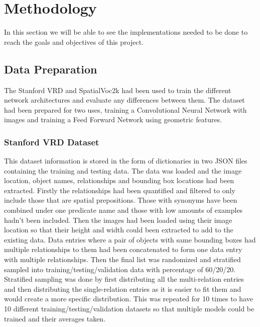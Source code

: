 \documentclass{csfyp}
\begin{document}
\section{Methodology}
In this section we will be able to see the implementations needed to be done to reach the goals and objectives of this project.

\subsection{Data Preparation}
The Stanford VRD and SpatialVoc2k had been used to train the different network architectures and evaluate any differences between them. The dataset had been prepared for two uses, training a Convolutional Neural Network with images and training a Feed Forward Network using geometric features. 

\subsubsection{Stanford VRD Dataset}
This dataset information is stored in the form of dictionaries in two JSON files containing the training and testing data. The data was loaded and the image location, object names, relationships and bounding box locations had been extracted. Firstly the relationships had been quantified and filtered to only include those that are spatial prepositions. Those with synonyms have been combined under one predicate name and those with low amounts of examples hadn’t been included. Then the images had been loaded using their image location so that their height and width could been extracted to add to the existing data. Data entries where a pair of objects with same bounding boxes had multiple relationships to them had been concatenated to form one data entry with multiple relationships. Then the final list was randomized and stratified sampled into training/testing/validation data with percentage of 60/20/20. Stratified sampling was done by first distributing all the multi-relation entries and then distributing the single-relation entries as it is easier to fit them and would create a more specific distribution. This was repeated for 10 times to have 10 different training/testing/validation datasets so that multiple models could be trained and their averages taken.
\end{document}

